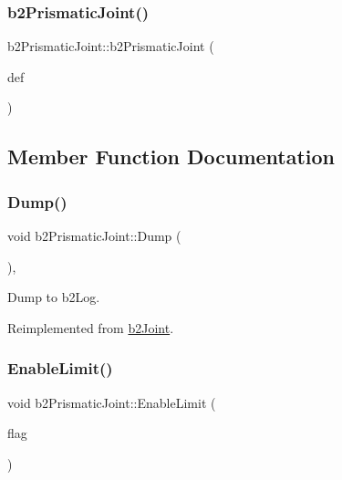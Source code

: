 \subsubsection{\texorpdfstring{b2PrismaticJoint()}{b2PrismaticJoint()}}
{\footnotesize\ttfamily b2\+Prismatic\+Joint\+::b2\+Prismatic\+Joint (\begin{DoxyParamCaption}\item[{const \mbox{\hyperlink{structb2_prismatic_joint_def}{b2\+Prismatic\+Joint\+Def}} $\ast$}]{def }\end{DoxyParamCaption})\hspace{0.3cm}{\ttfamily [protected]}}



\subsection{Member Function Documentation}
\mbox{\label{classb2_prismatic_joint_a843ddb0f912085f3deb3ee7320d7ddc7}} 
\subsubsection{\texorpdfstring{Dump()}{Dump()}}
{\footnotesize\ttfamily void b2\+Prismatic\+Joint\+::\+Dump (\begin{DoxyParamCaption}{ }\end{DoxyParamCaption})\hspace{0.3cm}{\ttfamily [override]}, {\ttfamily [virtual]}}



Dump to b2\+Log. 



Reimplemented from \mbox{\hyperlink{classb2_joint_abd35e7316017ad9a40d5dbf9b5ba3f36}{b2\+Joint}}.

\mbox{\label{classb2_prismatic_joint_a6d419afe7bd4b0e36d2e4607df7f79f2}} 
\subsubsection{\texorpdfstring{EnableLimit()}{EnableLimit()}}
{\footnotesize\ttfamily void b2\+Prismatic\+Joint\+::\+Enable\+Limit (\begin{DoxyParamCaption}\item[{bool}]{flag }\end{DoxyParamCaption})}



